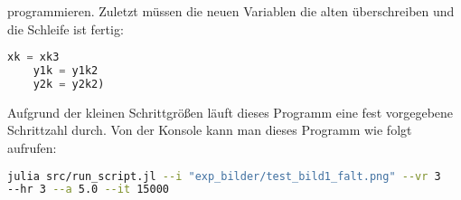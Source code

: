 \documentclass{article}
\theoremstyle{case}
\begin{document}
programmieren.
Zuletzt müssen die neuen Variablen die alten überschreiben und die Schleife ist fertig:
\begin{lstlisting}[language=Julia]
	xk = xk3
	y1k = y1k2
	y2k = y2k2)
\end{lstlisting}
Aufgrund der kleinen Schrittgrößen läuft dieses Programm eine fest vorgegebene Schrittzahl durch.
\newline
Von der Konsole kann man dieses Programm wie folgt aufrufen:
\begin{lstlisting}[language=bash]
julia src/run_script.jl --i "exp_bilder/test_bild1_falt.png" --vr 3
--hr 3 --a 5.0 --it 15000
\end{lstlisting}





%
%
\end{document}
